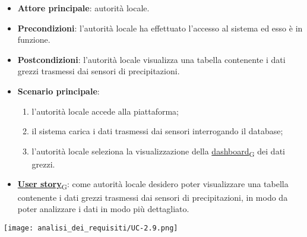 \begin{itemize}
	\item \textbf{Attore principale}: autorità locale.
	\item \textbf{Precondizioni}: l'autorità locale ha effettuato l'accesso al sistema ed esso è in funzione.
	\item \textbf{Postcondizioni}: l'autorità locale visualizza una tabella contenente i dati grezzi trasmessi dai sensori di precipitazioni.
	\item \textbf{Scenario principale}:
	      \begin{enumerate}
		      \item l'autorità locale accede alla piattaforma;
		      \item il sistema carica i dati trasmessi dai sensori interrogando il database;
		      \item l'autorità locale seleziona la visualizzazione della \href{https://7last.github.io/docs/rtb/documentazione-interna/glossario\#dashboard}{dashboard\textsubscript{G}} dei dati grezzi.
	      \end{enumerate}
	\item \href{https://7last.github.io/docs/rtb/documentazione-interna/glossario\#user-story}{\textbf{User story}\textsubscript{G}}:
	      come autorità locale desidero poter visualizzare una tabella contenente i dati grezzi trasmessi dai sensori di precipitazioni,
	      in modo da poter analizzare i dati in modo più dettagliato.
\end{itemize}
\begin{center}
	\texttt{[image: analisi\_dei\_requisiti/UC-2.9.png]}
\end{center}

\newpage

